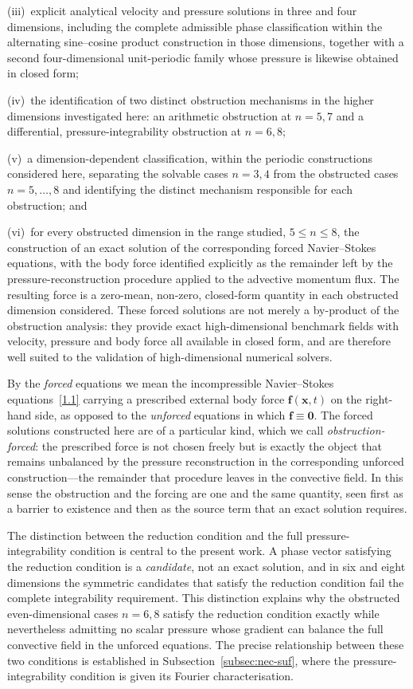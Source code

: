 \documentclass[11pt]{jfm}
\numberwithin{equation}{section}
\begin{document}
(iii)~explicit analytical velocity and pressure solutions in three and four
dimensions, including the complete admissible phase classification within the
alternating sine--cosine product construction in those dimensions, together with a
second four-dimensional unit-periodic family whose pressure is likewise obtained in
closed form;

(iv)~the identification of two distinct obstruction mechanisms in the higher
dimensions investigated here: an arithmetic obstruction at $n=5,7$ and a
differential, pressure-integrability obstruction at $n=6,8$;

(v)~a dimension-dependent classification, within the periodic constructions
considered here, separating the solvable cases $n=3,4$ from the obstructed cases
$n=5,\ldots,8$ and identifying the distinct mechanism responsible for each
obstruction; and

(vi)~for every obstructed dimension in the range studied, $5\leq n\leq8$, the
construction of an exact solution of the corresponding forced Navier--Stokes
equations, with the body force identified explicitly as the remainder left by the
pressure-reconstruction procedure applied to the advective momentum flux. The
resulting force is a zero-mean, non-zero, closed-form quantity in each obstructed
dimension considered. These forced solutions are not merely a by-product of the
obstruction analysis: they provide exact high-dimensional benchmark fields with
velocity, pressure and body force all available in closed form, and are therefore
well suited to the validation of high-dimensional numerical solvers.

By the \emph{forced} equations we mean the incompressible Navier--Stokes
equations~\eqref{1.1} carrying a prescribed external body force
$\boldsymbol{f}(\boldsymbol{x},t)$ on the right-hand side, as opposed to the
\emph{unforced} equations in which $\boldsymbol{f}\equiv\boldsymbol{0}$. The
forced solutions constructed here are of a particular kind, which we call
\emph{obstruction-forced}: the prescribed force is not chosen freely but is
exactly the object that remains unbalanced by the pressure reconstruction in the
corresponding unforced construction---the remainder that procedure leaves in the
convective field. In this sense the
obstruction and the forcing are one and the same quantity, seen first as a
barrier to existence and then as the source term that an exact solution
requires.

The distinction between the reduction condition and the full
pressure-integrability condition is central to the present work. A phase vector
satisfying the reduction condition is a \emph{candidate}, not an exact
solution, and in six and eight dimensions the symmetric candidates that satisfy
the reduction condition fail the complete integrability requirement. This distinction explains why the obstructed even-dimensional
cases $n=6,8$ satisfy the reduction condition exactly while nevertheless admitting no
scalar pressure whose gradient can balance the full convective field in the unforced equations. The precise relationship between these two
conditions is established in
Subsection~\ref{subsec:nec-suf}, where the pressure-integrability condition is
given its Fourier characterisation.
\end{document}
